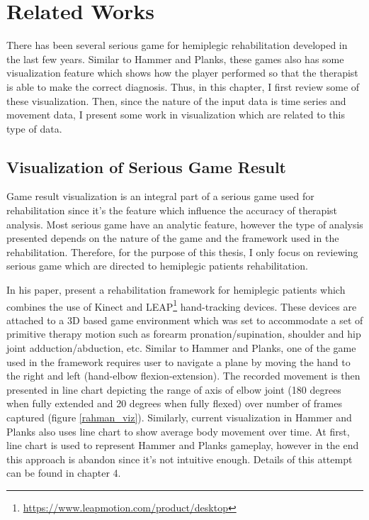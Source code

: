 \chapter{Related Works}
\label{chap:related}

There has been several serious game for hemiplegic rehabilitation developed in the last few years. Similar to Hammer and Planks, these games also has some visualization feature which shows how the player performed so that the therapist is able to make the correct diagnosis. Thus, in this chapter, I first review some of these visualization. Then, since the nature of the input data is time series and movement data, I present some work in visualization which are related to this type of data.

\section{Visualization of Serious Game Result} 

Game result visualization is an integral part of a serious game used for rehabilitation since it's the feature which influence the accuracy of therapist analysis. Most serious game have an analytic feature, however the type of analysis presented depends on the nature of the game and the framework used in the rehabilitation. Therefore, for the purpose of this thesis, I only focus on reviewing serious game which are directed to hemiplegic patients rehabilitation.

In his paper, \cite{rahman} present a rehabilitation framework for hemiplegic patients which combines the use of Kinect and LEAP\footnote{\url{https://www.leapmotion.com/product/desktop}} hand-tracking devices. These devices are attached to a 3D based game environment which was set to accommodate a set of primitive therapy motion such as forearm pronation/supination, shoulder and hip joint adduction/abduction, etc. Similar to Hammer and Planks, one of the game used in the framework requires user to navigate a plane by moving the hand to the right and left (hand-elbow flexion-extension). The recorded movement is then presented in line chart depicting the range of axis of elbow joint (180 degrees when fully extended and 20 degrees when fully flexed) over number of frames captured (figure \ref{rahman_viz}). Similarly, current visualization in Hammer and Planks also uses line chart to show average body movement over time. At first, line chart is used to represent Hammer and Planks gameplay, however in the end this approach is abandon since it's not intuitive enough. Details of this attempt can be found in chapter 4.


